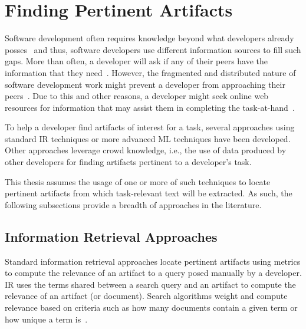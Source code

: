 \section{Finding Pertinent Artifacts}
\label{cp2:foraging-tools}



Software development often requires knowledge beyond what developers already posses~\cite{Li2013} and thus, 
software developers use different information sources to fill such gaps. 
More than often, a developer will ask if any of their 
peers have the information that they need~\cite{singer2011}. 
However, the fragmented and distributed nature of software development work 
might prevent a developer from approaching their peers~\cite{ko2007}.
Due to this and other reasons, a developer might seek
online web resources for information 
that may assist them in completing the task-at-hand~\cite{Xia2017, rao2020}.




To help a developer find artifacts of interest for a task,
several approaches
using 
standard \acf{IR} techniques or more advanced \acf{ML} techniques have been developed.
Other approaches leverage crowd knowledge, i.e.,
the use of data produced by other developers for finding artifacts pertinent to a developer's task.



This thesis assumes the usage of one or more of such techniques to locate pertinent
artifacts
from which task-relevant text will be extracted. As such, the following 
subsections provide a breadth of approaches in the literature. 




\subsection{Information Retrieval Approaches} 



Standard information retrieval approaches locate pertinent artifacts
using metrics to compute the relevance of an artifact to a query posed manually by a developer.
\acs{IR} uses the terms shared between a search query and an artifact
to compute the relevance of an artifact (or document).
Search algorithms weight and compute relevance based on 
criteria such as how many documents contain a given term or  
how unique a term is~\cite{Manning2009IR}.



